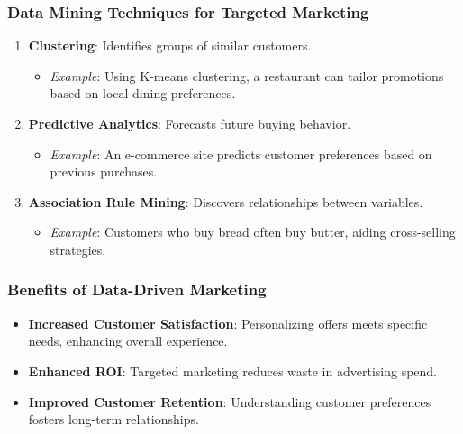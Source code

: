 \documentclass[aspectratio=169]{beamer}
\begin{document}
\begin{frame}[fragile]
    \frametitle{Data Mining Techniques for Targeted Marketing}
    \begin{enumerate}
        \item \textbf{Clustering}: Identifies groups of similar customers.
        \begin{itemize}
            \item \textit{Example}: Using K-means clustering, a restaurant can tailor promotions based on local dining preferences.
        \end{itemize}
        
        \item \textbf{Predictive Analytics}: Forecasts future buying behavior.
        \begin{itemize}
            \item \textit{Example}: An e-commerce site predicts customer preferences based on previous purchases.
        \end{itemize}

        \item \textbf{Association Rule Mining}: Discovers relationships between variables.
        \begin{itemize}
            \item \textit{Example}: Customers who buy bread often buy butter, aiding cross-selling strategies.
        \end{itemize}
    \end{enumerate}
\end{frame}

\begin{frame}[fragile]
    \frametitle{Benefits of Data-Driven Marketing}
    \begin{itemize}
        \item \textbf{Increased Customer Satisfaction}: Personalizing offers meets specific needs, enhancing overall experience.
        \item \textbf{Enhanced ROI}: Targeted marketing reduces waste in advertising spend.
        \item \textbf{Improved Customer Retention}: Understanding customer preferences fosters long-term relationships.
    \end{itemize}
\end{frame}
\end{document}
